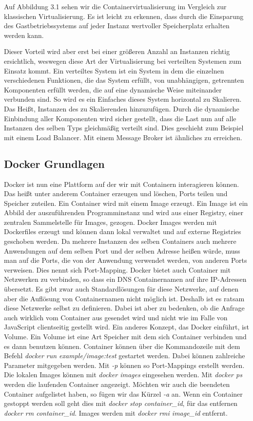 \documentclass[12pt,a4paper]{scrartcl}
\begin{document}
Auf Abbildung 3.1 sehen wir die Containervirtualisierung im Vergleich zur klassischen Virtualisierung. Es ist leicht zu erkennen, dass durch die Einsparung des Gastbetriebssystems auf jeder Instanz wertvoller Speicherplatz erhalten werden kann. 

Dieser Vorteil wird aber erst bei einer größeren Anzahl an Instanzen richtig ersichtlich, weswegen diese Art der Virtualisierung bei verteilten Systemen zum Einsatz kommt. Ein verteiltes System ist ein System in dem die einzelnen verschiedenen Funktionen, die das System erfüllt, von unabhängigen, getrennten Komponenten erfüllt werden, die auf eine dynamische Weise miteinander verbunden sind. So wird es ein Einfaches dieses System horizontal zu Skalieren. Das Heißt, Instanzen des zu Skalierenden hinzuzufügen. Durch die dynamische Einbindung aller Komponenten wird sicher gestellt, dass die Last nun auf alle Instanzen des selben Typs gleichmäßig verteilt sind. Dies geschieht zum Beispiel mit einem Load Balancer. Mit einem Message Broker ist ähnliches zu erreichen.

\subsection{Docker Grundlagen}

Docker ist nun eine Plattform auf der wir mit Containern interagieren können. Das heißt unter anderem Container erzeugen und löschen, Ports teilen und Speicher zuteilen. Ein Container wird mit einem Image erzeugt. Ein Image ist ein Abbild der auszuführenden Programminstanz und wird aus einer Registry, einer zentralen Sammelstelle für Images, gezogen. Docker Images werden mit Dockerfiles erzeugt und können dann lokal verwaltet und auf externe Registries geschoben werden. Da mehrere Instanzen des selben Containers auch mehrere Anwendungen auf dem selben Port und der selben Adresse heißen würde, muss man auf die Ports, die von der Anwendung verwendet werden, von anderen Ports verweisen. Dies nennt sich Port-Mapping. 
Docker bietet auch Container mit Netzwerken zu verbinden, so dass ein DNS Containernamen auf ihre IP-Adressen übersetzt. Es gibt zwar auch Standardlösungen für diese Netzwerke, auf denen aber die Auflösung von Containernamen nicht möglich ist. Deshalb ist es ratsam diese Netzwerke selbst zu definieren.
Dabei ist aber zu bedenken, ob die Anfrage auch wirklich vom Container aus gesendet wird und nicht wie im Falle von JavaScript clientseitig gestellt wird.
Ein anderes Konzept, das Docker einführt, ist Volume. Ein Volume ist eine Art Speicher mit dem sich Container verbinden und es dann benutzen können.
Container können über die Kommandozeile mit dem Befehl  \emph{docker run example/image:test} gestartet werden. Dabei können zahlreiche Parameter mitgegeben werden. Mit \emph{-p} können so Port-Mappings erstellt werden. Die lokalen Images können mit \emph{docker images} eingesehen werden. Mit \emph{docker ps} werden die laufenden Container angezeigt. Möchten wir auch die beendeten Container aufgelistet haben, so fügen wir das Kürzel \emph{-a} an. Wenn ein Container gestoppt werden soll geht dies mit \emph{docker stop container\_id}, für das entfernen \emph{docker rm container\_id}. Images werden mit \emph{docker rmi image\_id} entfernt.  
\end{document}
